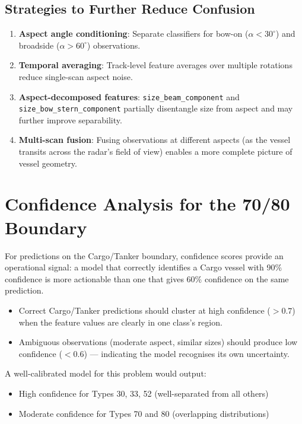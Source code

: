 \documentclass[journal]{IEEEtran}
\begin{document}
\subsection{Strategies to Further Reduce Confusion}

\begin{enumerate}
  \item \textbf{Aspect angle conditioning}: Separate classifiers for bow-on
        ($\alpha < 30^\circ$) and broadside ($\alpha > 60^\circ$) observations.
  \item \textbf{Temporal averaging}: Track-level feature averages over multiple
        rotations reduce single-scan aspect noise.
  \item \textbf{Aspect-decomposed features}: \texttt{size\_beam\_component} and
        \texttt{size\_bow\_stern\_component} partially disentangle size from
        aspect and may further improve separability.
  \item \textbf{Multi-scan fusion}: Fusing observations at different aspects
        (as the vessel transits across the radar's field of view) enables
        a more complete picture of vessel geometry.
\end{enumerate}

\section{Confidence Analysis for the 70/80 Boundary}
\label{sec:confidence}

For predictions on the Cargo/Tanker boundary, confidence scores provide an
operational signal: a model that correctly identifies a Cargo vessel with 90\%
confidence is more actionable than one that gives 60\% confidence on the same
prediction.

\begin{itemize}
  \item Correct Cargo/Tanker predictions should cluster at high confidence
        ($> 0.7$) when the feature values are clearly in one class's region.
  \item Ambiguous observations (moderate aspect, similar sizes) should produce
        low confidence ($< 0.6$) — indicating the model recognises its own
        uncertainty.
\end{itemize}

A well-calibrated model for this problem would output:
\begin{itemize}
  \item High confidence for Types 30, 33, 52 (well-separated from all others)
  \item Moderate confidence for Types 70 and 80 (overlapping distributions)
\end{itemize}
\end{document}
